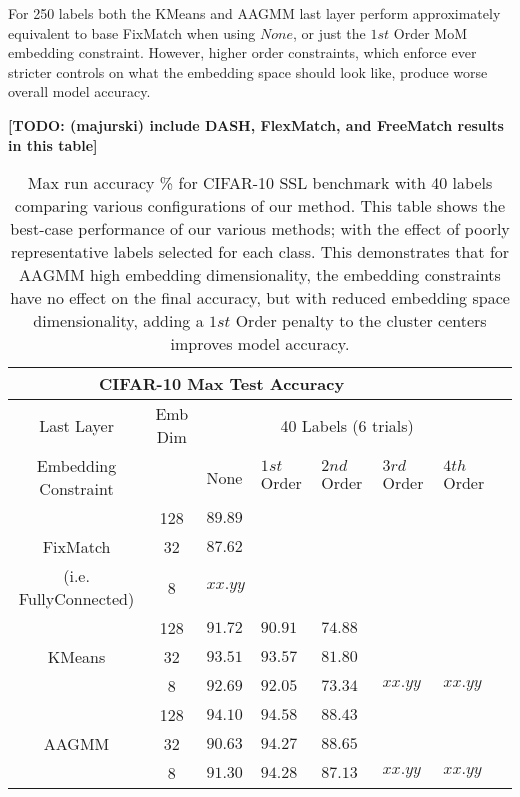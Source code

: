 \documentclass[10pt,twocolumn,letterpaper]{article}
\newcommand{\TODO}[1]{\textbf{\color{red}[TODO: #1]}}
\begin{document}
For 250 labels both the KMeans and AAGMM last layer perform approximately equivalent to base FixMatch when using $None$, or just the $1st$ Order MoM embedding constraint.
However, higher order constraints, which enforce ever stricter controls on what the embedding space should look like, produce worse overall model accuracy.

\TODO {(majurski) include DASH, FlexMatch, and FreeMatch results in this table}
\begin{table*}[ht!]
	\begin{tabularx}{\textwidth}{c|c|XXXXXX}
		\multicolumn{6}{c}{CIFAR-10 Max Test Accuracy} \\ \hline\hline
		Last Layer &   Emb Dim   & \multicolumn{5}{c}{40 Labels (6 trials)}            \\ 
		\hline
		Embedding Constraint  &  & None & $1st$ Order & $2nd$ Order & $3rd$ Order & $4th$ Order  \\ 
		\hline
		& 128  & $89.89$   &  &  &  &   \\
		FixMatch\cite{sohn2020fixmatch} & 32  & $87.62$     &  &  &  &   \\
		(i.e. FullyConnected) & 8  & $xx.yy$    &  &  &  &   \\
		\hline
		& 128  & $91.72$    & $90.91$   & $74.88$  &  &  \\
		KMeans & 32  & $93.51$     & $93.57$   & $81.80$   &  &  \\
		& 8  & $92.69$    & $92.05$  & $73.34$  & $xx.yy$  & $xx.yy$  \\
		\hline
		& 128  & $94.10$    & $94.58$   & $88.43$   &  &  \\
		AAGMM  & 32  & $90.63$    & $94.27$   & $88.65$   &  &  \\
		& 8  & $91.30$    & $94.28$   & $87.13$   & $xx.yy$  & $xx.yy$  \\
	\end{tabularx}
	\caption{Max run accuracy \% for CIFAR-10 SSL benchmark with 40 labels comparing various configurations of our method. This table shows the best-case performance of our various methods; with the effect of poorly representative labels selected for each class. This demonstrates that for AAGMM high embedding dimensionality, the embedding constraints have no effect on the final accuracy, but with reduced embedding space dimensionality, adding a $1st$ Order penalty to the cluster centers improves model accuracy.}
	\label{table1.5}
\end{table*}
\end{document}
